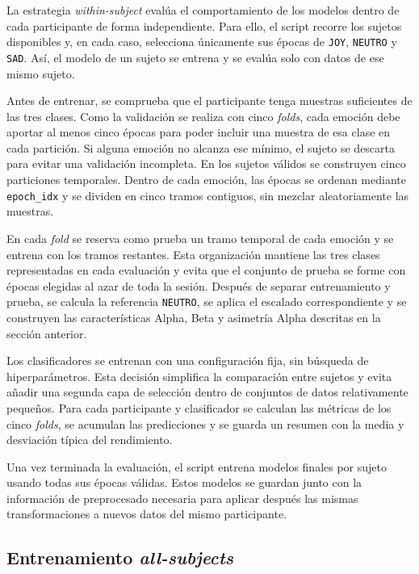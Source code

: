La estrategia \textit{within-subject} evalúa el comportamiento de los modelos dentro de cada participante de forma independiente. Para ello, el script recorre los sujetos disponibles y, en cada caso, selecciona únicamente sus épocas de \texttt{JOY}, \texttt{NEUTRO} y \texttt{SAD}. Así, el modelo de un sujeto se entrena y se evalúa solo con datos de ese mismo sujeto.

Antes de entrenar, se comprueba que el participante tenga muestras suficientes de las tres clases. Como la validación se realiza con cinco \textit{folds}, cada emoción debe aportar al menos cinco épocas para poder incluir una muestra de esa clase en cada partición. Si alguna emoción no alcanza ese mínimo, el sujeto se descarta para evitar una validación incompleta. En los sujetos válidos se construyen cinco particiones temporales. Dentro de cada emoción, las épocas se ordenan mediante \texttt{epoch\_idx} y se dividen en cinco tramos contiguos, sin mezclar aleatoriamente las muestras.

En cada \textit{fold} se reserva como prueba un tramo temporal de cada emoción y se entrena con los tramos restantes. Esta organización mantiene las tres clases representadas en cada evaluación y evita que el conjunto de prueba se forme con épocas elegidas al azar de toda la sesión. Después de separar entrenamiento y prueba, se calcula la referencia \texttt{NEUTRO}, se aplica el escalado correspondiente y se construyen las características Alpha, Beta y asimetría Alpha descritas en la sección anterior.

Los clasificadores se entrenan con una configuración fija, sin búsqueda de hiperparámetros. Esta decisión simplifica la comparación entre sujetos y evita añadir una segunda capa de selección dentro de conjuntos de datos relativamente pequeños. Para cada participante y clasificador se calculan las métricas de los cinco \textit{folds}, se acumulan las predicciones y se guarda un resumen con la media y desviación típica del rendimiento.

Una vez terminada la evaluación, el script entrena modelos finales por sujeto usando todas sus épocas válidas. Estos modelos se guardan junto con la información de preprocesado necesaria para aplicar después las mismas transformaciones a nuevos datos del mismo participante.

\subsection{Entrenamiento \textit{all-subjects}}

